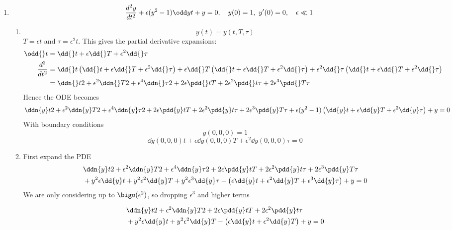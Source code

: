 \documentclass{X:/Documents/Coding/Latex/myassignment}
\begin{document}
\begin{enumerate}
	\clearpage
	\item 
	\[\frac{d^2y}{dt^2} + \epsilon(y^2-1)\odd yt + y = 0, \quad y(0) = 1, \ y'(0) = 0, \quad \epsilon\ll 1\]
	\begin{enumerate}
		\item %
		\[y(t) = y(t,T,\tau)\]
		$T=\epsilon t$ and $\tau = \epsilon^2 t$. 
		This gives the partial derivative expansions:
		\begin{align*}
			\odd{}t &=\dd{}t + \epsilon\dd{}T + \epsilon^2\dd{}\tau\\
			\frac{d^2}{dt^2} &= \dd{}t\left(\dd{}t + \epsilon\dd{}T + \epsilon^2\dd{}\tau\right) + \epsilon\dd{}T\left(\dd{}t + \epsilon\dd{}T + \epsilon^2\dd{}\tau\right) + \epsilon^2 \dd{}\tau\left(\dd{}t + \epsilon\dd{}T + \epsilon^2\dd{}\tau\right)\\
			&= \ddn{}t2 + \epsilon^2 \ddn{}T2 + \epsilon^4\ddn{}\tau2 + 2\epsilon\pdd{}tT + 2 \epsilon^2 \pdd{}t\tau + 2\epsilon^3\pdd{}T\tau
		\end{align*}
		Hence the ODE becomes
		\[\ddn{y}t2 + \epsilon^2 \ddn{y}T2 + \epsilon^4\ddn{y}\tau2 + 2\epsilon\pdd{y}tT + 2 \epsilon^2 \pdd{y}t\tau + 2\epsilon^3\pdd{y}T\tau + \epsilon(y^2-1)\left(\dd{y}t + \epsilon\dd{y}T + \epsilon^2\dd{y}\tau\right) + y = 0\]
		With boundary conditions
		\[y(0,0,0) = 1\]
		\[\dd{y(0,0,0)}t + \epsilon\dd{y(0,0,0)}T + \epsilon^2\dd{y(0,0,0)}\tau = 0\]
		\item %
		First expand the PDE
		\begin{align*}
			&\ddn{y}t2 + \epsilon^2 \ddn{y}T2 + \epsilon^4\ddn{y}\tau2 + 2\epsilon\pdd{y}tT + 2 \epsilon^2 \pdd{y}t\tau + 2\epsilon^3\pdd{y}T\tau \\
			&+ y^2\epsilon\dd{y}t + y^2\epsilon^2\dd{y}T + y^2\epsilon^3\dd{y}\tau- \left(\epsilon\dd{y}t + \epsilon^2\dd{y}T + \epsilon^3\dd{y}\tau\right) + y = 0	
		\end{align*}
		We are only considering up to $\bigo(\epsilon^2)$, so dropping $\epsilon^3$ and higher terms

		\begin{align*}
			&\ddn{y}t2 + \epsilon^2 \ddn{y}T2 + 2\epsilon\pdd{y}tT + 2 \epsilon^2 \pdd{y}t\tau \\
			&+ y^2\epsilon\dd{y}t + y^2\epsilon^2\dd{y}T- \left(\epsilon\dd{y}t + \epsilon^2\dd{y}T \right) + y = 0
		\end{align*}


\end{enumerate}
\end{enumerate}
\end{document}
